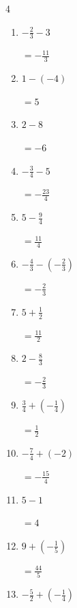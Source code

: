\begin{multicols}{4}
\begin{enumerate}
        $\displaystyle =-\frac{3}{2}$

  \item $\displaystyle -\frac{2}{3} - 3$

        $\displaystyle =-\frac{11}{3}$

  \item $\displaystyle 1 - \left(-4\right)$

        $\displaystyle =5$

  \item $\displaystyle 2 - 8$

        $\displaystyle =-6$

  \item $\displaystyle -\frac{3}{4} - 5$

        $\displaystyle =-\frac{23}{4}$

  \item $\displaystyle 5 - \frac{9}{4}$

        $\displaystyle =\frac{11}{4}$

\columnbreak %

  \item $\displaystyle -\frac{4}{3} - \left(-\frac{2}{3}\right)$

        $\displaystyle =-\frac{2}{3}$

  \item $\displaystyle 5 + \frac{1}{2}$

        $\displaystyle =\frac{11}{2}$

  \item $\displaystyle 2 - \frac{8}{3}$

        $\displaystyle =-\frac{2}{3}$

  \item $\displaystyle \frac{3}{4} + \left(-\frac{1}{4}\right)$

        $\displaystyle =\frac{1}{2}$

  \item $\displaystyle -\frac{7}{4} + \left(-2\right)$

        $\displaystyle =-\frac{15}{4}$

  \item $\displaystyle 5 - 1$

        $\displaystyle =4$

  \item $\displaystyle 9 + \left(-\frac{1}{5}\right)$

        $\displaystyle =\frac{44}{5}$

  \item $\displaystyle -\frac{5}{2} + \left(-\frac{1}{4}\right)$


\end{enumerate}
\end{multicols}
